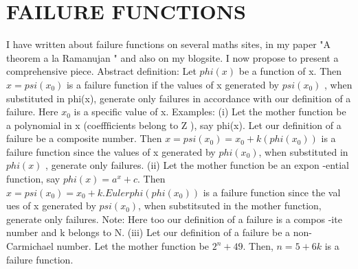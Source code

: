 \documentclass[12pt]{article}
\begin{document}
\section{FAILURE FUNCTIONS}
I have written about failure functions on several maths sites, in my paper "A theorem a la Ramanujan " and also on my blogsite. I now propose to present a comprehensive piece.
Abstract definition: Let $phi(x)$ be a function of x. Then
$x = psi(x_0)$ is a failure function if the values of x generated by $psi(x_0)$ , when substituted in phi(x), generate only failures in accordance with our definition of a failure. Here $x_0$ is a specific value of x.
Examples: (i) Let the mother function be a polynomial 
in x (coeffficients belong to Z ), say phi(x).
Let our definition of a failure be a 
composite number. Then $x = psi (x_0) = 
x_0 + k(phi(x_0))$ is a failure function
since the values of x generated by $phi (x_0)$, when substituted in $phi(x)$ ,
generate only failures.
(ii) Let the mother function be an expon
-ential function, say $phi(x) = a^x + c$.
Then $x= psi(x_0) = x_0 + k.Eulerphi(phi(
x_0))$ is a failure function since the val
ues of x generated by $psi(x_0)$, when 
substitsuted in the mother function,
generate only failures. Note: Here too 
our definition of a failure is a compos
-ite number and  k belongs to N.
(iii) Let our definition of a failure be a 
non-Carmichael number. Let the mother function be $2^n + 49$. 
Then, $n = 5 + 
6k$ is a failure function.
\end{document}
